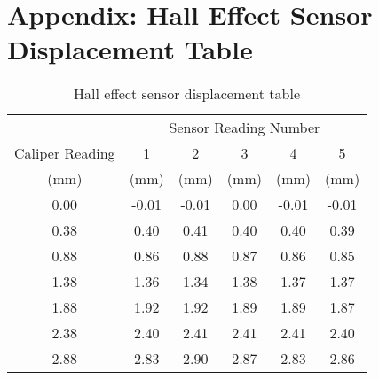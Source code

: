 \section{Appendix: Hall Effect Sensor Displacement Table}
\label{sec:appendix-hall-effect-sensor-displacement-table}

\begin{table}[h]
    \centering
    \caption{Hall effect sensor displacement table}
    \label{tab:appendix-hall-effect-sensor-displacement-table}
    \begin{tabular}{cccccc}
        \hline
        & \multicolumn{5}{c}{Sensor Reading Number} \\
        \cline{2-6}
        Caliper Reading & 1 & 2 & 3 & 4 & 5 \\
        (mm) & (mm) & (mm) & (mm) & (mm) & (mm) \\
        \midrule
        0.00 & -0.01 & -0.01 & 0.00 & -0.01 & -0.01 \\
        0.38 & 0.40 & 0.41 & 0.40 & 0.40 & 0.39 \\
        0.88 & 0.86 & 0.88 & 0.87 & 0.86 & 0.85 \\
        1.38 & 1.36 & 1.34 & 1.38 & 1.37 & 1.37 \\
        1.88 & 1.92 & 1.92 & 1.89 & 1.89 & 1.87 \\
        2.38 & 2.40 & 2.41 & 2.41 & 2.41 & 2.40 \\
        2.88 & 2.83 & 2.90 & 2.87 & 2.83 & 2.86 \\
        \hline
    \end{tabular}
\end{table}

